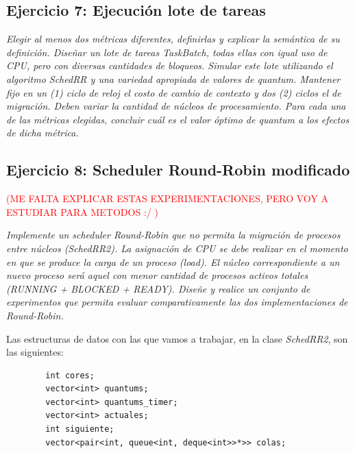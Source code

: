 \documentclass[a4paper]{article}
\begin{document}
 \subsection{Ejercicio 7: Ejecuci\'on lote de tareas}
\textit{Elegir al menos dos m\'etricas diferentes, definirlas y explicar la sem\'antica de su definici\'on. Dise\~nar un lote de tareas TaskBatch, todas ellas con igual uso de CPU, pero con diversas cantidades de bloqueos. Simular este lote utilizando el algoritmo SchedRR y una variedad apropiada de valores de quantum. Mantener fijo en un (1) ciclo de reloj el costo de cambio de contexto y dos (2) ciclos el de migraci\'on. Deben variar la cantidad de n\'ucleos de procesamiento. Para cada una de las m\'etricas elegidas, concluir cu\'al es el valor \'optimo de quantum a los efectos de dicha m\'etrica.}

\newpage
 \subsection{Ejercicio 8: Scheduler Round-Robin modificado}
 
\textcolor{red}{(ME FALTA EXPLICAR ESTAS EXPERIMENTACIONES, PERO VOY A ESTUDIAR PARA METODOS :/ )} 
 
\textit{Implemente un scheduler Round-Robin que no permita la migraci\'on de procesos entre n\'ucleos (SchedRR2). La asignaci\'on de CPU se debe realizar en el momento en que se produce la carga de un proceso (load). El n\'ucleo correspondiente a un nuevo proceso ser\'a aquel con menor cantidad de procesos activos totales (RUNNING + BLOCKED + READY). Dise\~ne y realice un conjunto de experimentos que permita evaluar comparativamente las dos implementaciones de Round-Robin.}


Las estructuras de datos con las que vamos a trabajar, en la clase \emph{SchedRR2}, son las siguientes:
	\begin{codesnippet}
	\begin{verbatim}
		int cores;
		vector<int> quantums;
		vector<int> quantums_timer;
		vector<int> actuales;
		int siguiente;
		vector<pair<int, queue<int, deque<int>>*>> colas;
	\end{verbatim}
	\end{codesnippet}
	
\end{document}
